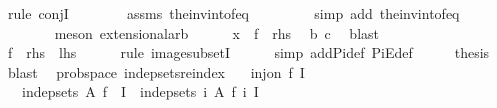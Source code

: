 \begin{isabellebody}
\ {\isacharparenleft}{\kern0pt}rule\ conjI{\isacharparenright}{\kern0pt}\isanewline
\ \ \ \ \ \ \isamarkupfalse%
\ assms\ the{\isacharunderscore}{\kern0pt}inv{\isacharunderscore}{\kern0pt}into{\isacharunderscore}{\kern0pt}f{\isacharunderscore}{\kern0pt}eq\ \isanewline
\ \ \ \ \ \ \isamarkupfalse%
\ {\isacharparenleft}{\kern0pt}simp\ add{\isacharcolon}{\kern0pt}\ the{\isacharunderscore}{\kern0pt}inv{\isacharunderscore}{\kern0pt}into{\isacharunderscore}{\kern0pt}f{\isacharunderscore}{\kern0pt}eq{\isacharparenright}{\kern0pt}\isanewline
\ \ \ \ \ \ \isamarkupfalse%
\ {\isacharparenleft}{\kern0pt}meson\ extensional{\isacharunderscore}{\kern0pt}arb{\isacharparenright}{\kern0pt}\isanewline
\ \ \ \ \isamarkupfalse%
\ {\isachardoublequoteopen}x\ {\isasymin}\ {\isacharquery}{\kern0pt}f\ {\isacharbackquote}{\kern0pt}\ {\isacharquery}{\kern0pt}rhs{\isachardoublequoteclose}\ \isamarkupfalse%
\ b\ c\ \isamarkupfalse%
\ blast\isanewline
\ \ \isamarkupfalse%
\isanewline
\ \ \isamarkupfalse%
\ \isamarkupfalse%
\ {\isachardoublequoteopen}{\isacharquery}{\kern0pt}f\ {\isacharbackquote}{\kern0pt}\ {\isacharquery}{\kern0pt}rhs\ {\isasymsubseteq}\ {\isacharquery}{\kern0pt}lhs{\isachardoublequoteclose}\isanewline
\ \ \ \ \isamarkupfalse%
\ {\isacharparenleft}{\kern0pt}rule\ image{\isacharunderscore}{\kern0pt}subsetI{\isacharparenright}{\kern0pt}\isanewline
\ \ \ \ \isamarkupfalse%
\ {\isacharparenleft}{\kern0pt}simp\ add{\isacharcolon}{\kern0pt}Pi{\isacharunderscore}{\kern0pt}def\ PiE{\isacharunderscore}{\kern0pt}def{\isacharparenright}{\kern0pt}\isanewline
\ \ \isamarkupfalse%
\ \isamarkupfalse%
\ {\isacharquery}{\kern0pt}thesis\ \isamarkupfalse%
\ blast\isanewline
{}\isamarkupfalse%
%
\endisatagproof
{\isafoldproof}%
%
\isadelimproof
\isanewline
%
\endisadelimproof
\isanewline
{}\isamarkupfalse%
\ {\isacharparenleft}{\kern0pt}\ prob{\isacharunderscore}{\kern0pt}space{\isacharparenright}{\kern0pt}\ indep{\isacharunderscore}{\kern0pt}sets{\isacharunderscore}{\kern0pt}reindex{\isacharcolon}{\kern0pt}\isanewline
\ \ \ {\isachardoublequoteopen}inj{\isacharunderscore}{\kern0pt}on\ f\ I{\isachardoublequoteclose}\isanewline
\ \ \ {\isachardoublequoteopen}indep{\isacharunderscore}{\kern0pt}sets\ A\ {\isacharparenleft}{\kern0pt}f\ {\isacharbackquote}{\kern0pt}\ I{\isacharparenright}{\kern0pt}\ {\isacharequal}{\kern0pt}\ indep{\isacharunderscore}{\kern0pt}sets\ {\isacharparenleft}{\kern0pt}{\isasymlambda}i{\isachardot}{\kern0pt}\ A\ {\isacharparenleft}{\kern0pt}f\ i{\isacharparenright}{\kern0pt}{\isacharparenright}{\kern0pt}\ I{\isachardoublequoteclose}\isanewline

\end{isabellebody}
